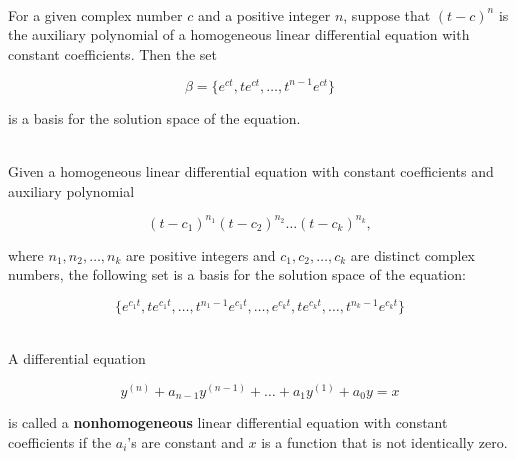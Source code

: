 \begin{lemma}
	\hfill\\
	For a given complex number $c$ and a positive integer $n$, suppose that $(t-c)^n$ is the auxiliary polynomial of a homogeneous linear differential equation with constant coefficients. Then the set

	\[\beta = \{e^{ct}, te^{ct}, \dots, t^{n-1}e^{ct}\}\]

	is a basis for the solution space of the equation.
\end{lemma}

\begin{theorem}
	\hfill\\
	Given a homogeneous linear differential equation with constant coefficients and auxiliary polynomial

	\[(t-c_1)^{n_1}(t-c_2)^{n_2}\dots(t-c_k)^{n_k},\]

	where $n_1, n_2, \dots, n_k$ are positive integers and $c_1, c_2, \dots, c_k$ are distinct complex numbers, the following set is a basis for the solution space of the equation:

	\[\{e^{c_1t}, te^{c_1t},\dots, t^{n_1-1}e^{c_1t}, \dots, e^{c_kt}, te^{c_kt}, \dots, t^{n_k-1}e^{c_kt}\}\]
\end{theorem}

\begin{definition}
	\hfill\\
	A differential equation

	\[y^{(n)} + a_{n-1}y^{(n-1)} + \dots + a_1y^{(1)} + a_0y = x\]

	is called a \textbf{nonhomogeneous} linear differential equation with constant coefficients if the $a_i$'s are constant and $x$ is a function that is not identically zero.
\end{definition}
